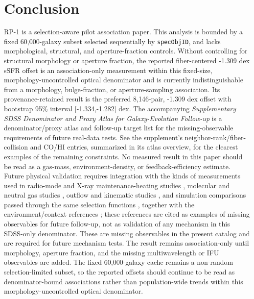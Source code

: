 \documentclass[twocolumn]{aastex631}
\begin{document}
\section{Conclusion}
RP-1 is a selection-aware pilot association paper. This analysis is bounded by a fixed 60,000-galaxy subset selected sequentially by \texttt{specObjID}, and lacks morphological, structural, and aperture-fraction controls. Without controlling for structural morphology or aperture fraction, the reported fiber-centered -1.309 dex sSFR offset is an association-only measurement within this fixed-size, morphology-uncontrolled optical denominator and is currently indistinguishable from a morphology, bulge-fraction, or aperture-sampling association. Its provenance-retained result is the preferred 8,146-pair, -1.309 dex offset with bootstrap 95\% interval [-1.334,-1.282] dex. The accompanying \emph{Supplementary SDSS Denominator and Proxy Atlas for Galaxy-Evolution Follow-up} is a denominator/proxy atlas and follow-up target list for the missing-observable requirements of future real-data tests. See the supplement's neighbor-rank/fiber-collision and CO/HI entries, summarized in its atlas overview, for the clearest examples of the remaining constraints. No measured result in this paper should be read as a gas-mass, environment-density, or feedback-efficiency estimate.
Future physical validation requires integration with the kinds of measurements used in radio-mode and X-ray maintenance-heating studies \citep{best2005,fabian2012,mcnamara2007,heckmanbest2014,lamassa2013}, molecular and neutral gas studies \citep{xcoldgass2017,xgass2018}, outflow and kinematic studies \citep{veilleux2005,cicone2014,carniani2017,fiore2017}, and simulation comparisons passed through the same selection functions \citep{simba2019,tng2019,eagle2015}, together with the environment/context references \citep{peng2010,ellison2011,piotrowska2022,wetzel2013,dekel2006}; these references are cited as examples of missing observables for future follow-up, not as validation of any mechanism in this SDSS-only denominator. These are missing observables in the present catalog and are required for future mechanism tests. The result remains association-only until morphology, aperture fraction, and the missing multiwavelength or IFU observables are added. The fixed 60,000-galaxy cache remains a non-random selection-limited subset, so the reported offsets should continue to be read as denominator-bound associations rather than population-wide trends within this morphology-uncontrolled optical denominator.
\end{document}

